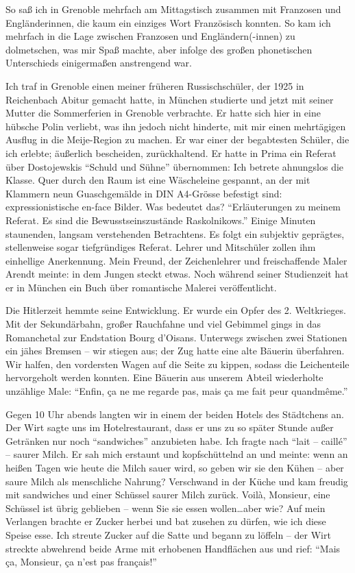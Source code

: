 So saß ich in Grenoble mehrfach am Mittagstisch zusammen mit Franzosen und Engländerinnen, die kaum ein einziges Wort Französisch konnten. So kam ich mehrfach in die Lage zwischen Franzosen und Engländern(-innen) zu dolmetschen, was mir Spaß machte, aber infolge des großen phonetischen Unterschieds einigermaßen anstrengend war.

Ich traf in Grenoble einen meiner früheren Russischschüler, der 1925 in Reichenbach Abitur gemacht hatte, in München studierte und jetzt mit seiner Mutter die Sommerferien in Grenoble verbrachte. Er hatte sich hier in eine hübsche Polin verliebt, was ihn jedoch nicht hinderte, mit mir einen mehrtägigen Ausflug in die Meije-Region zu machen. Er war einer der begabtesten Schüler, die ich erlebte; äußerlich bescheiden, zurückhaltend. Er hatte in Prima ein Referat über Dostojewskis \enquote{Schuld und Sühne} übernommen: Ich betrete ahnungslos die Klasse. Quer durch den Raum ist eine Wäscheleine gespannt, an der mit Klammern neun Guaschgemälde in DIN A4-Grösse befestigt sind: expressionistische en-face Bilder. Was bedeutet das? \enquote{Erläuterungen zu meinem Referat. Es sind die Bewusstseinszustände Raskolnikows.} Einige Minuten staunenden, langsam verstehenden Betrachtens. Es folgt ein subjektiv geprägtes, stellenweise sogar tiefgründiges Referat. Lehrer und Mitschüler zollen ihm einhellige Anerkennung. Mein Freund, der Zeichenlehrer und freischaffende Maler Arendt meinte: in dem Jungen steckt etwas. Noch während seiner Studienzeit hat er in München ein Buch über romantische Malerei veröffentlicht.

Die Hitlerzeit hemmte seine Entwicklung. Er wurde ein Opfer des 2. Weltkrieges.\\

Mit der Sekundärbahn, großer Rauchfahne und viel Gebimmel gings in das Romanchetal zur Endstation Bourg d'Oisans. Unterwegs zwischen zwei Stationen ein jähes Bremsen -- wir stiegen aus; der Zug hatte eine alte Bäuerin überfahren. Wir halfen, den vordersten Wagen auf die Seite zu kippen, sodass die Leichenteile hervorgeholt werden konnten. Eine Bäuerin aus unserem Abteil wiederholte unzählige Male: \enquote{Enfin, ça ne me regarde pas, mais ça me fait peur quandmême.}

Gegen 10 Uhr abends langten wir in einem der beiden Hotels des Städtchens an. Der Wirt sagte uns im Hotelrestaurant, dass er uns zu so später Stunde außer Getränken nur noch \enquote{sandwiches} anzubieten habe. Ich fragte nach \enquote{lait -- caillé} -- saurer Milch. Er sah mich erstaunt und kopfschüttelnd an und meinte: wenn an heißen Tagen wie heute die Milch sauer wird, so geben wir sie den Kühen -- aber saure Milch als menschliche Nahrung? Verschwand in der Küche und kam freudig mit sandwiches und einer Schüssel saurer Milch zurück. Voilà, Monsieur, eine Schüssel ist übrig geblieben -- wenn Sie sie essen wollen\dots aber wie? Auf mein Verlangen brachte er Zucker herbei und bat zusehen zu dürfen, wie ich diese Speise esse. Ich streute Zucker auf die Satte und begann zu löffeln -- der Wirt streckte abwehrend beide Arme mit erhobenen Handflächen aus und rief: \enquote{Mais ça, Monsieur, ça n'est pas français!}

